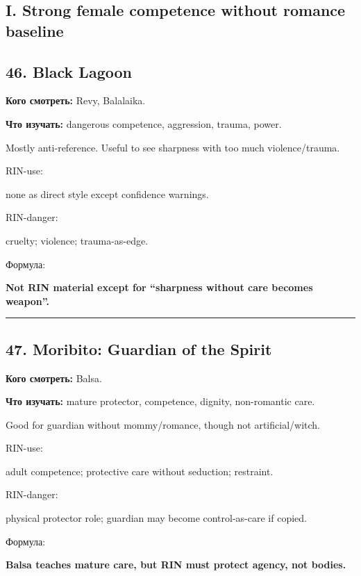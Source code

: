 \subsection*{I. Strong female competence without romance baseline}

\subsection*{46. Black Lagoon}

\textbf{Кого смотреть:} Revy, Balalaika.

\textbf{Что изучать:} dangerous competence, aggression, trauma, power.

Mostly anti-reference. Useful to see sharpness with too much
violence/\hspace{0pt}trauma.

RIN-use:

none as direct style except confidence warnings.

RIN-danger:

cruelty; violence; trauma-as-edge.

Формула:

\textbf{Not RIN material except for ``sharpness without care becomes
weapon''.}

\begin{center}\rule{0.5\linewidth}{0.5pt}\end{center}

\subsection*{47. Moribito: Guardian of the Spirit}

\textbf{Кого смотреть:} Balsa.

\textbf{Что изучать:} mature protector, competence, dignity,
non-romantic care.

Good for guardian without mommy/\hspace{0pt}romance, though not artificial/\hspace{0pt}witch.

RIN-use:

adult competence; protective care without seduction; restraint.

RIN-danger:

physical protector role; guardian may become control-as-care if copied.

Формула:

\textbf{Balsa teaches mature care, but RIN must protect agency, not
bodies.}

